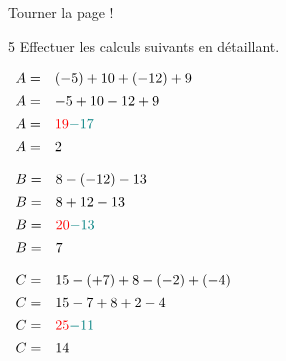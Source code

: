 \documentclass[a4paper]{book}
\begin{document}
{\vfill
\hfill Tourner la page !
\newpage


    \begin{exerciceNote}{5}
        Effectuer les calculs suivants en détaillant.

        \begin{minipage}{0.30\linewidth}
            $\begin{array}{ll}
                A = & (-5)+10+(-12)+9 \\[1ex]
                A = & -5+10-12+9\\[1ex]
                A = & \textcolor{red}{19}\textcolor{teal}{-17}\\[1ex]
                A = & 2
            \end{array}$

            \vspace{0.5cm}

            $\begin{array}{ll}
                B = & 8-(-12)-13 \\[1ex]
                B = & 8+12-13\\[1ex]
                B = & \textcolor{red}{20}\textcolor{teal}{-13}\\[1ex]
                B = & 7
            \end{array}$
        \end{minipage}
        \hfill
        \begin{minipage}{0.30\linewidth}
            $\begin{array}{ll}
                C = & 15-(+7)+8-(-2)+(-4) \\[1ex]
                C = & 15-7+8+2-4 \\[1ex]
                C = & \textcolor{red}{25}\textcolor{teal}{-11} \\[1ex]
                C = & 14
            \end{array}$

            \vspace{0.5cm}


\end{minipage}
\end{exerciceNote}}
\end{document}
